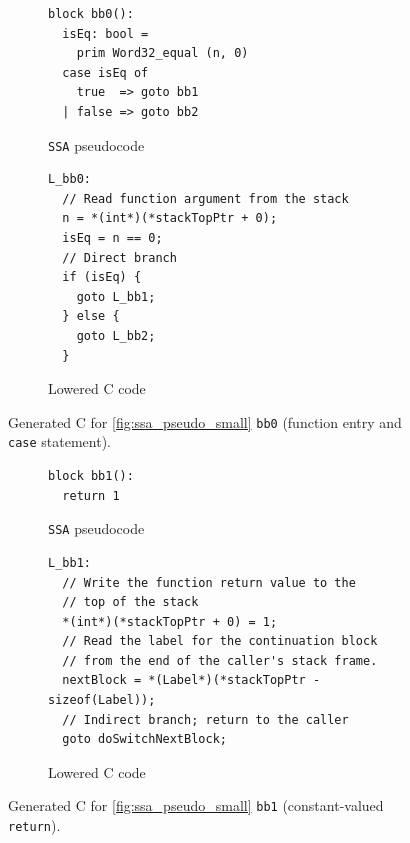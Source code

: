 \begin{figure}[htbp]
  \centering
  \begin{subfigure}[t]{0.42\textwidth}
    \caption{\texttt{SSA} pseudocode}
    \label{fig:ssa_pseudo_small_bb0}
    \vspace{1mm}
\begin{verbatim}
block bb0():
  isEq: bool =
    prim Word32_equal (n, 0)
  case isEq of
    true  => goto bb1
  | false => goto bb2
\end{verbatim}
  \end{subfigure}\hfill
  \begin{subfigure}[t]{0.55\textwidth}
    \caption{Lowered C code}
    \label{fig:c_pseudo_small_bb0}
    \vspace{1mm}
\begin{verbatim}
L_bb0:
  // Read function argument from the stack
  n = *(int*)(*stackTopPtr + 0);
  isEq = n == 0;
  // Direct branch
  if (isEq) {
    goto L_bb1;
  } else {
    goto L_bb2;
  }
\end{verbatim}
  \end{subfigure}
  \caption{Generated C for \cref{fig:ssa_pseudo_small} \texttt{bb0} (function entry and \texttt{case} statement).}
  \label{fig:pseudo_small_bb0}
\end{figure}

\begin{figure}[htbp]
  \centering
  \begin{subfigure}[t]{0.42\textwidth}
    \caption{\texttt{SSA} pseudocode}
    \label{fig:ssa_pseudo_small_bb1}
    \vspace{1mm}
\begin{verbatim}
block bb1():
  return 1
\end{verbatim}
  \end{subfigure}\hfill
  \begin{subfigure}[t]{0.55\textwidth}
    \caption{Lowered C code}
    \label{fig:c_pseudo_small_bb1}
    \vspace{1mm}
\begin{verbatim}
L_bb1:
  // Write the function return value to the
  // top of the stack
  *(int*)(*stackTopPtr + 0) = 1;
  // Read the label for the continuation block
  // from the end of the caller's stack frame.
  nextBlock = *(Label*)(*stackTopPtr - sizeof(Label));
  // Indirect branch; return to the caller
  goto doSwitchNextBlock;
\end{verbatim}
  \end{subfigure}
  \caption{Generated C for \cref{fig:ssa_pseudo_small} \texttt{bb1} (constant-valued \texttt{return}).}
  \label{fig:pseudo_small_bb1}
\end{figure}

